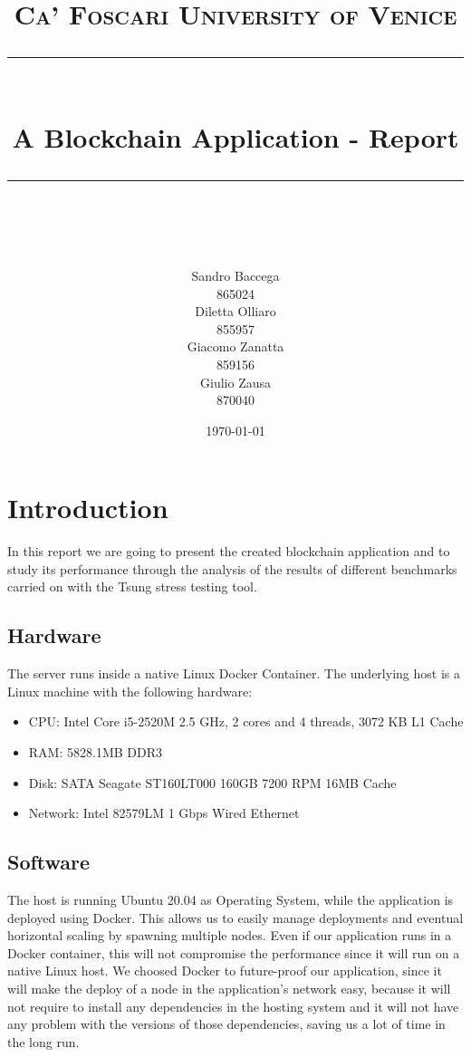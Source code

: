 \documentclass[11pt]{scrartcl} %
\title{	
	\normalfont\normalsize
	\textsc{Ca' Foscari University of Venice}\\ %
	\vspace{25pt} %
	\rule{\linewidth}{0.5pt}\\ %
	\vspace{20pt} %
	{\huge A Blockchain Application - Report}\\ %
	\vspace{12pt} %
	\rule{\linewidth}{2pt}\\ %
	\vspace{12pt} %
}
\author{\hspace{-0.8cm} \parbox{4cm}{\centering
  Sandro Baccega\\ 865024} \parbox{4cm}{\centering
  Diletta Olliaro\\ 855957} \parbox{4cm}{\centering
  Giacomo Zanatta\\ 859156} \parbox{4cm}{\centering Giulio Zausa\\ 870040} } %
\date{\vspace{20pt}\today} %
\begin{document}
\maketitle %



\section{Introduction}

In this report we are going to present the created blockchain application and to study its performance through the analysis of the results of different benchmarks carried on with the Tsung stress testing tool.

\subsection{Hardware}
The server runs inside a native Linux Docker Container. The underlying host is a Linux machine with the following hardware:
\begin{itemize}
\item[\adforn{43}] CPU: Intel Core i5-2520M 2.5 GHz, 2 cores and 4 threads, 3072 KB L1 Cache
\item[\adforn{43}] RAM: 5828.1MB DDR3
\item[\adforn{43}] Disk: SATA Seagate ST160LT000 160GB 7200 RPM 16MB Cache
\item[\adforn{43}] Network: Intel 82579LM 1 Gbps Wired Ethernet
\end{itemize}

\subsection{Software}

The host is running Ubuntu 20.04 as Operating System, while the application is deployed using Docker. 
This allows us to easily manage deployments and eventual horizontal scaling by spawning multiple nodes. 
Even if our application runs in a Docker container, this will not compromise the performance since it will run on a native Linux host. 
We choosed Docker to future-proof our application, since it will make the deploy of a node in the application's network easy, because it will not require to install any dependencies in the hosting system and it will not have any problem with the versions of those dependencies, saving us a lot of time in the long run.
\end{document}
